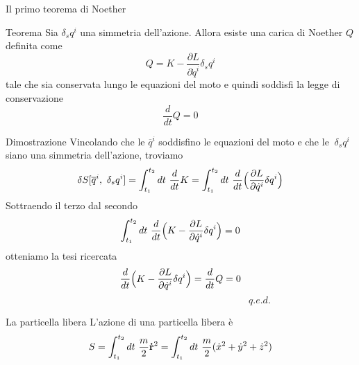 \begin{frame}{Il primo teorema di Noether}
    \begin{block}{Teorema}
        Sia $\delta_s q^i$ una simmetria dell'azione. Allora esiste una carica di Noether $Q$ definita come
        \begin{equation*}
            Q = K - \frac{\partial L}{\partial \dot q^i} \delta_s q^i
        \end{equation*}
            tale che sia conservata lungo le equazioni del moto e quindi soddisfi la legge di conservazione
        \begin{equation*} 
            \frac{d}{dt} Q = 0
        \end{equation*}
    \end{block}
\end{frame}

\begin{frame}

    \begin{block}{Dimostrazione}
        Vincolando che le $\overline q^i$ soddisfino le equazioni del moto e che le $~\delta_s q^i$ siano una simmetria dell'azione, troviamo
        \begin{equation*}
            \delta S[\overline q^i, ~\delta_s q^i] = \int_{t_1}^{t_2}dt~ \frac{d}{dt} K = \int_{t_1}^{t_2}dt~ \frac{d}{dt} \Big( \frac{\partial L}{\partial\dot q^i} \delta q^i \Big )
        \end{equation*}
          Sottraendo il terzo dal secondo
        \begin{equation*}
            \int_{t_1}^{t_2}dt~ \frac{d}{dt} \Big (K - \frac{\partial L}{\partial\dot q^i} \delta q^i \Big ) = 0
        \end{equation*}
          otteniamo la tesi ricercata
        \begin{equation*}
            \frac{d}{dt} \Big (K - \frac{\partial L}{\partial\dot q^i} \delta q^i \Big ) = \frac{d}{dt} Q = 0
        \end{equation*}
        $\qquad \qquad \qquad \qquad \qquad \qquad \qquad \qquad \qquad \qquad \qquad \qquad \quad q.e.d.$
    \end{block}

\end{frame}

\begin{frame}{La particella libera}
    L'azione di una particella libera è
    \begin{equation*}
        S = \int_{t_1}^{t_2}dt~ \frac{m}{2} \mathbf{\dot r}^2 = \int_{t_1}^{t_2}dt~ \frac{m}{2} (\dot x^2 + \dot y^2 + \dot z^2)
    \end{equation*} 
\end{frame}

